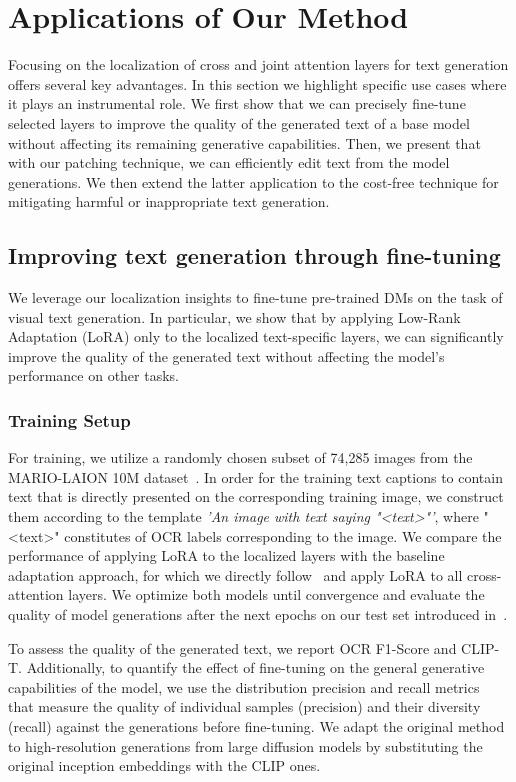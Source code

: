 \section{Applications of Our Method}




Focusing on the localization of cross and joint attention layers for text generation offers several key advantages.
In this section we highlight specific use cases where it plays an instrumental role. We first show that we can precisely fine-tune selected layers to improve the quality of the generated text of a base model without affecting its remaining generative capabilities. Then, we
present that with our patching technique, we can efficiently edit text from the model generations. We then extend the latter application to the cost-free technique for mitigating harmful or inappropriate text generation.


\subsection{Improving text generation through fine-tuning}
\label{sec:finetuning}
We leverage our localization insights to fine-tune pre-trained DMs on the task of visual text generation. In particular, we show that by applying Low-Rank Adaptation (LoRA) only to the localized text-specific layers, we can significantly improve the quality of the generated text without affecting the model's performance on other tasks.


\subsubsection{Training Setup}
For training, we utilize a randomly chosen subset of 74,285 images from the MARIO-LAION 10M dataset~\cite{textdiffuser}. In order for the training text captions to contain text that is directly presented on the corresponding training image, we construct them according to
the template \textit{'An image with text saying "\textless text\textgreater"'}, where "\textless text\textgreater" constitutes of OCR labels corresponding to the image.
We compare the performance of applying LoRA to the localized layers with the baseline adaptation approach, for which we directly follow~\cite{hu2022lora} and apply LoRA to all cross-attention layers. We optimize both models until convergence and evaluate the quality of model generations after the next epochs on our test set introduced in~.

To assess the quality of the generated text, we report OCR F1-Score and CLIP-T. Additionally, to quantify the effect of fine-tuning on the general generative capabilities of the model, we use the distribution precision and recall metrics~\citep{kynkaanniemi2019improved} that measure the quality of individual samples (precision) and their diversity (recall) against the generations before fine-tuning. We adapt the original method to high-resolution generations from large diffusion models by substituting the original inception embeddings with the CLIP ones.



